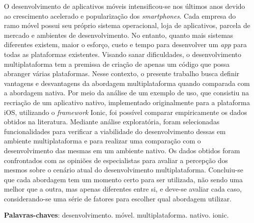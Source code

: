 \begin{resumo}

 O desenvolvimento de aplicativos móveis intensificou-se nos últimos anos devido ao crescimento acelerado e popularização dos 
 \textit{smartphones}. Cada empresa do ramo móvel possui seu próprio sistema operacional, loja de aplicativos, parcela de mercado
  e ambientes de desenvolvimento. No entanto, quanto mais sistemas diferentes existem, maior o esforço, custo e tempo para 
  desenvolver um \textit{app} para todas as plataformas existentes.
 Visando sanar dificuldades, o desenvolvimento multiplataforma tem a premissa de criação de apenas um código que possa abranger 
 várias plataformas. 
 Nesse contexto, o presente trabalho busca definir vantagens e desvantagens da abordagem multiplataforma 
 quando comparada com a abordagem nativa. 
 Por meio da análise de um exemplo de uso, que consistiu na recriação de um aplicativo 
 nativo, implementado originalmente para a plataforma iOS, utilizando o \textit{framework} Ionic, foi possível comparar empiricamente os dados obtidos na literatura. 
 Mediante análise exploratória, foram selecionadas funcionalidades para verificar a viabilidade do desenvolvimento dessas
 em ambiente multiplataforma e para realizar uma comparação com o desenvolvimento das mesmas em um ambiente nativo. Os dados 
 obtidos foram confrontados com as opiniões de especialistas para avaliar a percepção dos mesmos sobre o cenário atual do 
 desenvolvimento multiplataforma. Concluiu-se que cada abordagem tem um momento certo 
 para ser utilizada, não sendo uma melhor que a outra, mas apenas diferentes entre si, e deve-se avaliar cada caso, 
 considerando-se uma série de fatores para escolher qual abordagem utilizar.

 \vspace{\onelineskip}
    
 \noindent
 \textbf{Palavras-chaves}: desenvolvimento. móvel. multiplataforma. nativo. ionic. 
\end{resumo}
